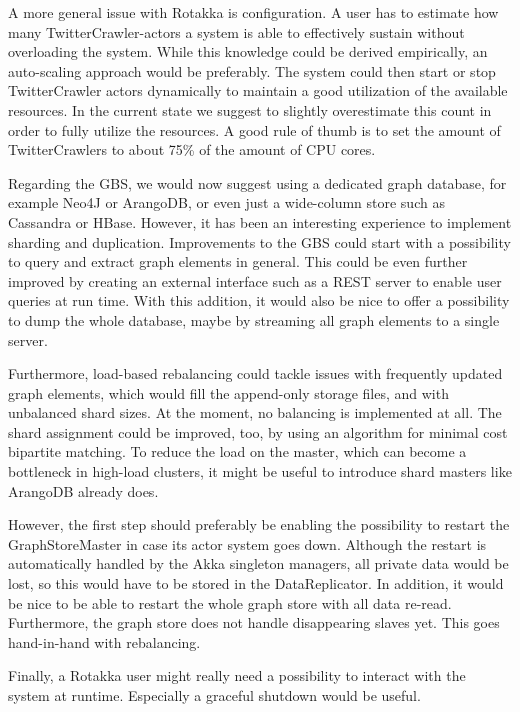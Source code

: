 \documentclass{sigchi}
\begin{document}
A more general issue with Rotakka is configuration. A user has to estimate how many TwitterCrawler-actors a system is able to effectively sustain without overloading the system. While this knowledge could be derived empirically, an auto-scaling approach would be preferably. The system could then start or stop TwitterCrawler actors dynamically to maintain a good utilization of the available resources. In the current state we suggest to slightly overestimate this count in order to fully utilize the resources. A good rule of thumb is to set the amount of TwitterCrawlers to about 75\% of the amount of CPU cores.

Regarding the GBS, we would now suggest using a dedicated graph database, for example Neo4J or ArangoDB, or even just a wide-column store such as Cassandra or HBase. However, it has been an interesting experience to implement sharding and duplication. Improvements to the GBS could start with a possibility to query and extract graph elements in general. This could be even further improved by creating an external interface such as a REST server to enable user queries at run time. With this addition, it would also be nice to offer a possibility to dump the whole database, maybe by streaming all graph elements to a single server.

Furthermore, load-based rebalancing could tackle issues with frequently updated graph elements, which would fill the append-only storage files, and with unbalanced shard sizes. At the moment, no balancing is implemented at all. The shard assignment could be improved, too, by using an algorithm for minimal cost bipartite matching. To reduce the load on the master, which can become a bottleneck in high-load clusters, it might be useful to introduce shard masters like ArangoDB already does.

However, the first step should preferably be enabling the possibility to restart the GraphStoreMaster in case its actor system goes down. Although the restart is automatically handled by the Akka singleton managers, all private data would be lost, so this would have to be stored in the DataReplicator. In addition, it would be nice to be able to restart the whole graph store with all data re-read. Furthermore, the graph store does not handle disappearing slaves yet. This goes hand-in-hand with rebalancing.

Finally, a Rotakka user might really need a possibility to interact with the system at runtime. Especially a graceful shutdown would be useful.
\end{document}
